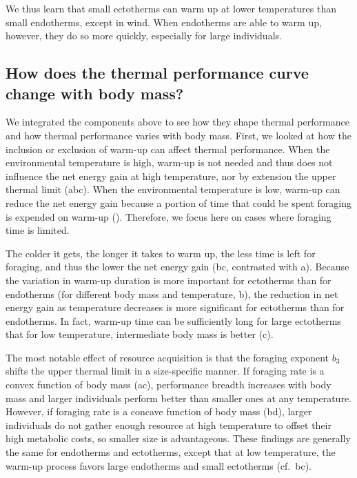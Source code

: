 We thus learn that small ectotherms can warm up at lower temperatures than small endotherms, except in wind.
When endotherms are able to warm up, however, they do so more quickly, especially for large individuals.


\subsection*{How does the thermal performance curve change with body mass?}

We integrated the components above to see how they shape thermal performance and how thermal performance varies with body mass.
First, we looked at how the inclusion or exclusion of warm-up can affect thermal performance.
When the environmental temperature is high, warm-up is not needed and thus does not influence the net energy gain at high temperature, nor by extension the upper thermal limit (abc).
When the environmental temperature is low, warm-up can reduce the net energy gain because a portion of time that could be spent foraging is expended on warm-up ().
Therefore, we focus here on cases where foraging time is limited.

The colder it gets, the longer it takes to warm up, the less time is left for foraging, and thus the lower the net energy gain (bc, contrasted with a).
Because the variation in warm-up duration is more important for ectotherms than for endotherms (for different body mass and temperature, b), the reduction in net energy gain as temperature decreases is more significant for ectotherms than for endotherms.
In fact, warm-up time can be sufficiently long for large ectotherms that for low temperature, intermediate body mass is better (c).


The most notable effect of resource acquisition is that the foraging exponent $b_3$ shifts the upper thermal limit in a size-specific manner.
If foraging rate is a convex function of body mass (ac), performance breadth increases with body mass and larger individuals perform better than smaller ones at any temperature.
However, if foraging rate is a concave function of body mass (bd), larger individuals do not gather enough resource at high temperature to offset their high metabolic costs, so smaller size is advantageous.
These findings are generally the same for endotherms and ectotherms, except that at low temperature, the warm-up process favors large endotherms and small ectotherms (cf.~bc).

